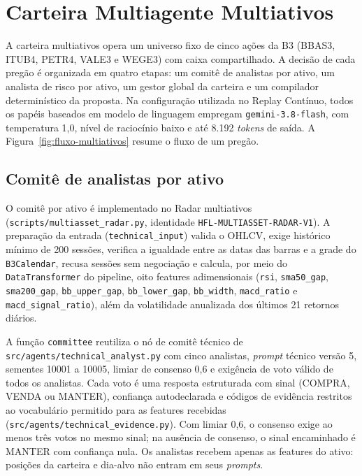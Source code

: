\documentclass{eic-bcc-tcc}
\begin{document}
\section{Carteira Multiagente Multiativos}
\label{sec:arq-multiativos}

A carteira multiativos opera um universo fixo de cinco ações da B3 (BBAS3, ITUB4, PETR4, VALE3 e WEGE3) com caixa compartilhado. A decisão de cada pregão é organizada em quatro etapas: um comitê de analistas por ativo, um analista de risco por ativo, um gestor global da carteira e um compilador determinístico da proposta. Na configuração utilizada no Replay Contínuo, todos os papéis baseados em modelo de linguagem empregam \texttt{gemini-3.8-flash}, com temperatura 1,0, nível de raciocínio baixo e até 8.192 \textit{tokens} de saída. A Figura~\ref{fig:fluxo-multiativos} resume o fluxo de um pregão.

\subsection{Comitê de analistas por ativo}

O comitê por ativo é implementado no Radar multiativos (\texttt{scripts/multiasset\_radar.py}, identidade \texttt{HFL-MULTIASSET-RADAR-V1}). A preparação da entrada (\texttt{technical\_input}) valida o OHLCV, exige histórico mínimo de 200 sessões, verifica a igualdade entre as datas das barras e a grade do \texttt{B3Calendar}, recusa sessões sem negociação e calcula, por meio do \texttt{DataTransformer} do pipeline, oito features adimensionais (\texttt{rsi}, \texttt{sma50\_gap}, \texttt{sma200\_gap}, \texttt{bb\_upper\_gap}, \texttt{bb\_lower\_gap}, \texttt{bb\_width}, \texttt{macd\_ratio} e \texttt{macd\_signal\_ratio}), além da volatilidade anualizada dos últimos 21 retornos diários.

A função \texttt{committee} reutiliza o nó de comitê técnico de \texttt{src/agents/technical\_analyst.py} com cinco analistas, \textit{prompt} técnico versão 5, sementes 10001 a 10005, limiar de consenso 0,6 e exigência de voto válido de todos os analistas. Cada voto é uma resposta estruturada com sinal (COMPRA, VENDA ou MANTER), confiança autodeclarada e códigos de evidência restritos ao vocabulário permitido para as features recebidas (\texttt{src/agents/technical\_evidence.py}). Com limiar 0,6, o consenso exige ao menos três votos no mesmo sinal; na ausência de consenso, o sinal encaminhado é MANTER com confiança nula. Os analistas recebem apenas as features do ativo: posições da carteira e dia-alvo não entram em seus \textit{prompts}.
\end{document}
